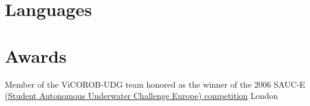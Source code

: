 \documentclass[11pt,a4paper,sans]{moderncv}
\begin{document}
\makecvtitle





\section{Languages}

%


\section{Awards}
  {Member of the {ViCOROB-UDG} team honored as the winner of the 2006 {SAUC-E} \href{http://sauc-europe.org/about.html}{(Student Autonomous Underwater Challenge Europe) competition}}
  {}{}{London}{}
\end{document}
